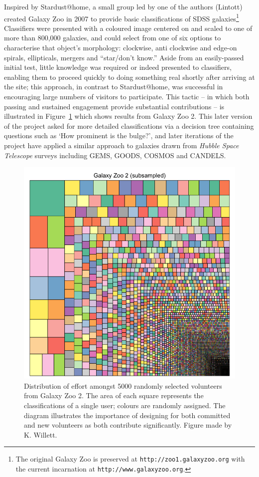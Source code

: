 \documentclass{ar2e}
\def\Fref#1{Figure~\ref{#1}\xspace}
\def\url#1{\texttt{#1}}
\begin{document}
Inspired by Stardust@home, a small group led by one of the authors (Lintott) created
Galaxy Zoo in 2007 to provide basic classifications of SDSS
galaxies\footnote{The original Galaxy Zoo is preserved at
\url{http://zoo1.galaxyzoo.org} with the current incarnation at
\url{http://www.galaxyzoo.org}.} Classifiers were presented with a coloured
image centered on and scaled to one of more than 800,000 galaxies, and could
select from one of six options to characterise that object's morphology: 
clockwise, anti clockwise and edge-on spirals,
ellipticals, mergers and ``star/don't know.'' Aside from  an easily-passed
initial test, little knowledge was required or indeed presented to classifiers,
enabling them to proceed quickly to doing something real 
shortly after arriving at the
site; this approach, in contrast to Stardust@home, was
successful in encouraging large numbers of visitors to participate. 
This tactic -- in which both passing and sustained engagement provide
substantial contributions -- is illustrated in \Fref{fig:gz2} which shows results from
Galaxy Zoo 2. This later version of the project asked for more detailed
classifications via a decision tree containing questions such as `How prominent
is the bulge?', and later iterations of the project have applied a similar
approach to galaxies drawn from \textit{Hubble Space Telescope} surveys including
\textsc{GEMS, GOODS, COSMOS} and \textsc{CANDELS}. 


\begin{figure}[!ht]
\centering\includegraphics[width=\linewidth]{figs/gz2squares.png}
\caption{Distribution of effort amongst 5000 randomly selected volunteers from
Galaxy Zoo 2. The area of each square represents the classifications of a single
user; colours are randomly assigned. The diagram illustrates the importance of
designing for both committed and new volunteers as both contribute
significantly. Figure made by K. Willett.}
\label{fig:gz2}
\end{figure}
\end{document}
